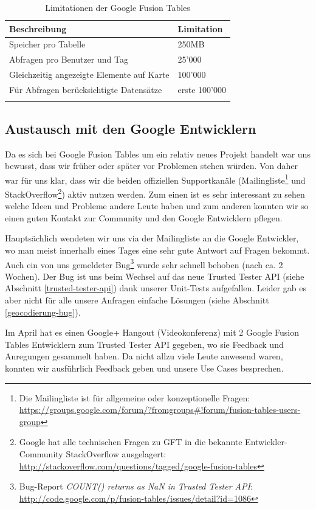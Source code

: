 \begin{longtable}{|l|l|}
\hline 
\textbf{Beschreibung} & \textbf{Limitation} \\ 
\hline 
Speicher pro Tabelle & 250MB \\ 
\hline 
Abfragen pro Benutzer und Tag & 25'000 \\ 
\hline 
Gleichzeitig angezeigte Elemente auf Karte & 100'000 \\ 
\hline 
Für Abfragen berücksichtigte Datensätze & erste 100'000 \\ 
\hline 
\caption{Limitationen der Google Fusion Tables}
\label{gft-limitations}
\end{longtable} 

\subsection{Austausch mit den Google Entwicklern}
\label{austausch-mit-google}
Da es sich bei Google Fusion Tables um ein relativ neues Projekt handelt war uns bewusst, dass wir früher oder später vor Problemen stehen würden. Von daher war für uns klar, dass wir die beiden offiziellen Supportkanäle (Mailingliste\footnote{Die Mailingliste ist für allgemeine oder konzeptionelle Fragen: \url{https://groups.google.com/forum/?fromgroups\#!forum/fusion-tables-users-group}} und StackOverflow\footnote{Google hat alle technischen Fragen zu GFT in die bekannte Entwickler-Community StackOverflow ausgelagert: \url{http://stackoverflow.com/questions/tagged/google-fusion-tables}}) aktiv nutzen werden. Zum einen ist es sehr interessant zu sehen welche Ideen und Probleme andere Leute haben und zum anderen konnten wir so einen guten Kontakt zur Community und den Google Entwicklern pflegen.

Hauptsächlich wendeten wir uns via der Mailingliste an die Google Entwickler, wo man meist innerhalb eines Tages eine sehr gute Antwort auf Fragen bekommt. Auch ein von uns gemeldeter Bug\footnote{Bug-Report \emph{COUNT() returns as NaN in Trusted Tester API}: \url{http://code.google.com/p/fusion-tables/issues/detail?id=1086}} wurde sehr schnell behoben (nach ca. 2 Wochen). Der Bug ist uns beim Wechsel auf das neue Trusted Tester API (siehe Abschnitt \ref{trusted-tester-api}) dank unserer Unit-Tests aufgefallen. Leider gab es aber nicht für alle unsere Anfragen einfache Lösungen (siehe Abschnitt \ref{geocodierung-bug}).

Im April hat es einen Google+ Hangout (Videokonferenz) mit 2 Google Fusion Tables Entwicklern zum Trusted Tester API gegeben, wo sie Feedback und Anregungen gesammelt haben. Da nicht allzu viele Leute anwesend waren, konnten wir ausführlich Feedback geben und unsere Use Cases besprechen.









